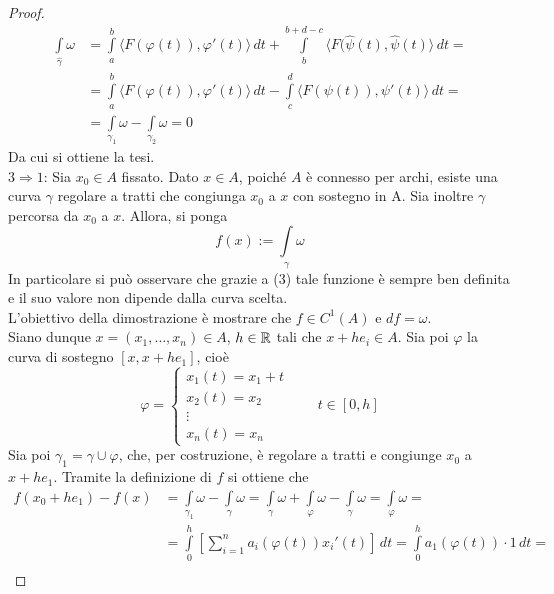 \begin{proof}
\begin{equation*}
\begin{aligned}
\int\limits_{\hat{{\gamma}}}{\omega} &= \int\limits_{a}^{b} \langle F(\varphi(t)), \varphi'(t)\rangle \, dt + \int\limits_{b}^{b+d-c}{\langle F(\hat{\psi}(t), \hat{\psi}(t) \rangle}\, dt=\\ 
&= \int\limits_{a}^{b} \langle F(\varphi(t)), \varphi'(t)\rangle \, dt - \int\limits_{c}^{d}{\langle F(\psi(t)), \psi'(t) \rangle}\, dt =\\
&= \int\limits_{\gamma_1}{\omega} - \int\limits_{\gamma_2}{\omega} = 0
\end{aligned}
\end{equation*}
Da cui si ottiene la tesi.\\
$3 \Rightarrow 1$: Sia $x_0 \in A$ fissato. Dato $x \in A$, poiché $A$ è connesso per archi, esiste una curva $\gamma$ regolare a tratti che congiunga $x_0$ a $x$ con sostegno in A. Sia inoltre $\gamma$ percorsa da $x_0$ a $x$. Allora, si ponga
\begin{equation*}
    f(x):=\int\limits_{\gamma}{\omega}
\end{equation*}
In particolare si può osservare che grazie a (3) tale funzione è sempre ben definita e il suo valore non dipende dalla curva scelta.\\
L'obiettivo della dimostrazione è mostrare che $f \in C^1(A)$ e $df= \omega$.\\
Siano dunque $x=(x_1, \dots, x_n) \in A$, $h \in \mathbb{R}$ tali che $x+he_i \in A$. Sia poi $\varphi$ la curva di sostegno $[x, x+he_1]$, cioè
\begin{equation*}
    \varphi= \begin{cases}
        x_1(t)=x_1+t\\
        x_2(t)=x_2\\
        \vdots\\
        x_n(t)=x_n
    \end{cases}
    \qquad t \in [0,h]
\end{equation*}
Sia poi $\gamma_1= \gamma \cup \varphi$, che, per costruzione, è regolare a tratti e congiunge $x_0$ a $x+he_1$. Tramite la definizione di $f$ si ottiene che
\begin{equation*}
\begin{aligned}
    f(x_0+he_1)-f(x)&=\int\limits_{\gamma_1}{\omega}- \int\limits_{\gamma}{\omega}= \int\limits_{\gamma}{\omega}+\int\limits_{\varphi}{\omega}-\int\limits_{\gamma}{\omega}= \int\limits_{\varphi}{\omega}=\\
    &=\int\limits_{0}^{h}{\left[\sum\limits_{i=1}^{n}{a_i(\varphi(t))x_i'(t)} \right]}\, dt=    \int\limits_{0}^{h}{a_1(\varphi(t))\cdot 1}\, dt =\\ 

\end{aligned}
\end{equation*}
\end{proof}
